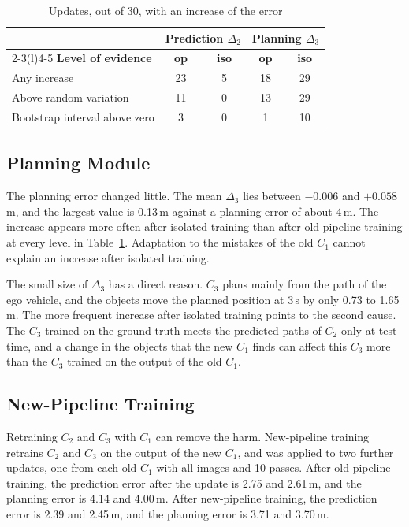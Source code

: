 \documentclass[conference]{IEEEtran}
\begin{document}
\begin{table}[t]
\centering
\caption{Updates, out of 30, with an increase of the error}
\label{tab:counts}
\footnotesize
\setlength{\tabcolsep}{4pt}
\begin{tabular}{@{}lcccc@{}}
\toprule
& \multicolumn{2}{c}{\textbf{Prediction $\Delta_2$}} & \multicolumn{2}{c}{\textbf{Planning $\Delta_3$}} \\
\cmidrule(lr){2-3}\cmidrule(l){4-5}
\textbf{Level of evidence} & \textbf{op} & \textbf{iso} & \textbf{op} & \textbf{iso} \\
\midrule
Any increase & 23 & 5 & 18 & 29 \\
Above random variation & 11 & 0 & 13 & 29 \\
Bootstrap interval above zero & 3 & 0 & 1 & 10 \\
\bottomrule
\end{tabular}
\end{table}

\subsection{Planning Module}
The planning error changed little. The mean $\Delta_3$ lies between $-0.006$
and $+0.058$\,m, and the largest value is 0.13\,m against a planning error of
about 4\,m. The increase appears more often after isolated training than after old-pipeline training at every level in Table~\ref{tab:counts}. Adaptation to the mistakes of the old $C_1$ cannot explain an increase after isolated training.

The small size of $\Delta_3$ has a direct reason. $C_3$ plans mainly from the path of the ego vehicle, and the objects move the planned position at 3\,s by only 0.73 to 1.65\,m.  The more frequent increase after isolated training points to the second cause. The $C_3$ trained on the ground truth meets the predicted paths of $C_2$ only at test time, and a change in the objects that the new $C_1$ finds can affect this $C_3$ more than the $C_3$ trained on the output of the old $C_1$.

\subsection{New-Pipeline Training}
Retraining $C_2$ and $C_3$ with $C_1$ can remove the harm. New-pipeline training retrains $C_2$ and $C_3$ on the output of the new $C_1$, and was applied to two further updates, one from each old $C_1$ with all images and 10 passes. After old-pipeline training, the prediction error after the update is 2.75 and 2.61\,m, and the planning error is 4.14 and 4.00\,m. After new-pipeline training, the prediction error is 2.39 and 2.45\,m, and the planning error is 3.71 and 3.70\,m.
\end{document}
